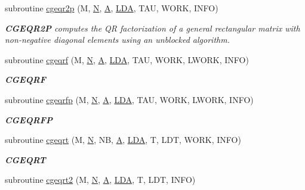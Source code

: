 \begin{DoxyCompactItemize}
subroutine \hyperlink{group__complexGEcomputational_ga5b971cf36596a0145b900eea05be8771}{cgeqr2p} (M, \hyperlink{polmisc_8c_a0240ac851181b84ac374872dc5434ee4}{N}, \hyperlink{classA}{A}, \hyperlink{example__user_8c_ae946da542ce0db94dced19b2ecefd1aa}{L\+D\+A}, T\+A\+U, W\+O\+R\+K, I\+N\+F\+O)
\begin{DoxyCompactList}\small\item\em {\bfseries C\+G\+E\+Q\+R2\+P} computes the Q\+R factorization of a general rectangular matrix with non-\/negative diagonal elements using an unblocked algorithm. \end{DoxyCompactList}\item 
subroutine \hyperlink{group__complexGEcomputational_ga333680795e2818318a1c6f6d1a503722}{cgeqrf} (M, \hyperlink{polmisc_8c_a0240ac851181b84ac374872dc5434ee4}{N}, \hyperlink{classA}{A}, \hyperlink{example__user_8c_ae946da542ce0db94dced19b2ecefd1aa}{L\+D\+A}, T\+A\+U, W\+O\+R\+K, L\+W\+O\+R\+K, I\+N\+F\+O)
\begin{DoxyCompactList}\small\item\em {\bfseries C\+G\+E\+Q\+R\+F} \end{DoxyCompactList}\item 
subroutine \hyperlink{group__complexGEcomputational_ga815fb74daf0dc3255daaca1070171301}{cgeqrfp} (M, \hyperlink{polmisc_8c_a0240ac851181b84ac374872dc5434ee4}{N}, \hyperlink{classA}{A}, \hyperlink{example__user_8c_ae946da542ce0db94dced19b2ecefd1aa}{L\+D\+A}, T\+A\+U, W\+O\+R\+K, L\+W\+O\+R\+K, I\+N\+F\+O)
\begin{DoxyCompactList}\small\item\em {\bfseries C\+G\+E\+Q\+R\+F\+P} \end{DoxyCompactList}\item 
subroutine \hyperlink{group__complexGEcomputational_gaf7103c1ce604baf7b0f7946496a72baf}{cgeqrt} (M, \hyperlink{polmisc_8c_a0240ac851181b84ac374872dc5434ee4}{N}, N\+B, \hyperlink{classA}{A}, \hyperlink{example__user_8c_ae946da542ce0db94dced19b2ecefd1aa}{L\+D\+A}, T, L\+D\+T, W\+O\+R\+K, I\+N\+F\+O)
\begin{DoxyCompactList}\small\item\em {\bfseries C\+G\+E\+Q\+R\+T} \end{DoxyCompactList}\item 
subroutine \hyperlink{group__complexGEcomputational_gad4ad3f605b1a33a24e9f4adc82fc0d51}{cgeqrt2} (M, \hyperlink{polmisc_8c_a0240ac851181b84ac374872dc5434ee4}{N}, \hyperlink{classA}{A}, \hyperlink{example__user_8c_ae946da542ce0db94dced19b2ecefd1aa}{L\+D\+A}, T, L\+D\+T, I\+N\+F\+O)

\end{DoxyCompactItemize}
